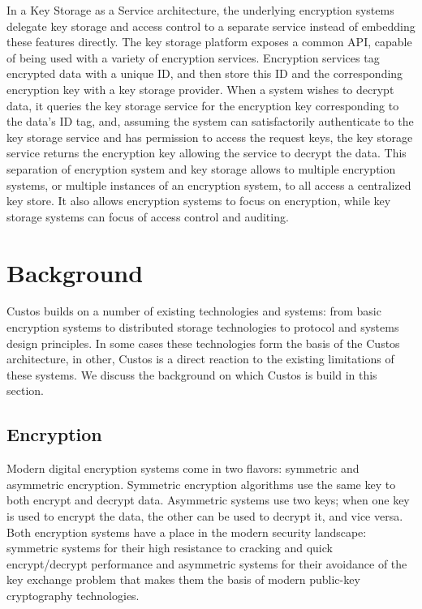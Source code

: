 In a Key Storage as a Service architecture, the underlying encryption
systems delegate key storage and access control to a separate service
instead of embedding these features directly. The key storage platform
exposes a common API, capable of being used with a variety of
encryption services. Encryption services tag encrypted data with a
unique ID, and then store this ID and the corresponding encryption key
with a key storage provider. When a system wishes to decrypt data, it
queries the key storage service for the encryption key corresponding
to the data's ID tag, and, assuming the system can satisfactorily
authenticate to the key storage service and has permission to access the
request keys, the key storage service returns the encryption key
allowing the service to decrypt the data. This separation of encryption
system and key storage allows to multiple encryption systems, or
multiple instances of an encryption system, to all access a centralized
key store. It also allows encryption systems to focus on encryption,
while key storage systems can focus of access control and auditing.

\section{Background}

Custos builds on a number of existing technologies and systems: from
basic encryption systems to distributed storage technologies to
protocol and systems design principles. In some cases these
technologies form the basis of the Custos architecture, in other,
Custos is a direct reaction to the existing limitations of these
systems. We discuss the background on which Custos is build in this
section.

\subsection{Encryption}

Modern digital encryption systems come in two flavors: symmetric and
asymmetric encryption. Symmetric encryption algorithms use the same
key to both encrypt and decrypt data. Asymmetric systems use two keys;
when one key is used to encrypt the data, the other can be used to
decrypt it, and vice versa. Both encryption systems have a place in
the modern security landscape: symmetric systems for their high
resistance to cracking and quick encrypt/decrypt performance and
asymmetric systems for their avoidance of the key exchange problem
that makes them the basis of modern public-key cryptography
technologies.

